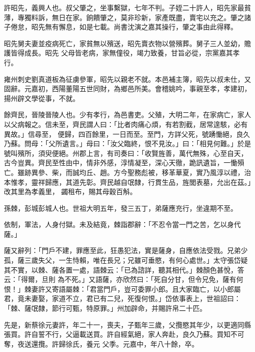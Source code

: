 \begin{pinyinscope}
 許昭先，義興人也。叔父肇之，坐事繫獄，七年不判。子姪二十許人，昭先家最貧薄，專獨料訴，無日在家。餉饋肇之，莫非珍新，家產既盡，賣宅以充之。肇之諸子倦怠，昭先無有懈息，如是七載。尚書沈演之嘉其操行，肇之事由此得釋。



 昭先舅夫妻並疫病死亡，家貧無以殯送，昭先賣衣物以營殯葬。舅子三人並幼，贍護皆得成長。昭先
 父母皆老病，家無僮役，竭力致養，甘旨必從，宗黨嘉其孝行。



 雍州刺史劉真道板為征虜參軍，昭先以親老不就。本邑補主簿，昭先以叔未仕，又固辭。元嘉初，西陽董陽五世同財，為鄉邑所美。會稽姚吟，事親至孝，孝建初，揚州辟文學從事，不就。



 餘齊民，晉陵晉陵人也。少有孝行，為邑書吏。父殖，大明二年，在家病亡，家人以父病報之。信未至，齊民謂人曰：「比者肉痛心煩，有若割截，居常遑駭，必有異故。」信尋至，
 便歸，四百餘里，一日而至。至門，方詳父死，號踴慟絕，良久乃蘇。問母：「父所遺言。」母曰：「汝父臨終，恨不見汝。」曰：「相見何難。」於是號叫殯所，須臾便絕。州郡上言，有司奏曰：「收賢旌善，萬代無殊，心至自天，古今豈異。齊民至性由中，情非外感，淳情凝至，深心天徹，跪訊遺旨，一慟殞亡。雖跡異參、柴，而誠均丘、趙。方今聖務彪被，移革華夏，實乃風淳以禮，治本惟孝，靈祥歸應，其道先彰。齊民越自氓隸，行貫生品，旌閭表墓，允出在茲。」改其里為孝義里，
 蠲租布，賜其母穀百斛。



 孫棘，彭城彭城人也。世祖大明五年，發三五丁，弟薩應充行，坐違期不至。



 依制，軍法，人身付獄。未及結竟，棘詣郡辭：「不忍令當一門之苦，乞以身代薩。」



 薩又辭列：「門戶不建，罪應至此，狂愚犯法，實是薩身，自應依法受戮。兄弟少孤，薩三歲失父，一生恃賴，唯在長兄；兄雖可垂愍，有何心處世。」太守張岱疑其不實，以棘、薩各置一處，語棘云：「已為諮詳，聽其相代。」棘顏色甚悅，答云：「得爾，旦則
 為不死。」又語薩，亦欣然曰：「死自分甘，但令兄免，薩有何恨！」棘妻許又寄語屬棘：「君當門戶，豈可委罪小郎。且大家臨亡，以小郎屬君，竟未妻娶，家道不立，君已有二兒，死復何恨。」岱依事表上，世祖詔曰：「棘、薩氓隸，節行可甄，特原罪。」州加辟命，并賜許帛二十匹。



 先是，新蔡徐元妻許，年二十一，喪夫，子甄年三歲，父攬愍其年少，以更適同縣張買。許自誓不行，父逼載送買。許自經氣絕，家人奔赴，良久乃蘇。買知不可奪，夜送還攬。許歸徐氏，養元
 父季。元嘉中，年八十餘，卒。




\end{pinyinscope}
